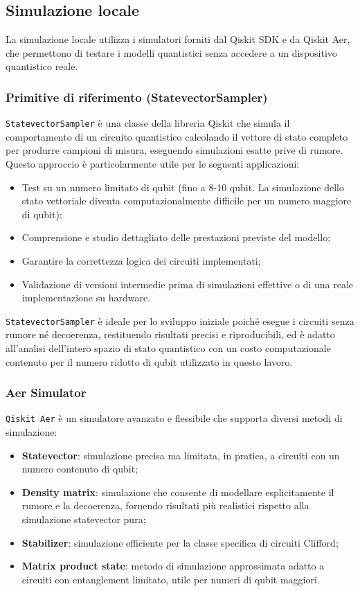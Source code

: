 \subsection{Simulazione locale}

La simulazione locale utilizza i simulatori forniti dal Qiskit SDK e da Qiskit Aer, che permettono di testare i modelli quantistici senza accedere a un dispositivo quantistico reale.

\subsubsection{Primitive di riferimento (StatevectorSampler)}
\texttt{StatevectorSampler} è una classe della libreria Qiskit che simula il comportamento di un circuito quantistico calcolando il vettore di stato completo per produrre campioni di misura, eseguendo simulazioni esatte prive di rumore.
Questo approccio è particolarmente utile per le seguenti applicazioni:
\begin{itemize}
    \item Test su un numero limitato di qubit (fino a 8-10 qubit. La simulazione dello stato vettoriale diventa computazionalmente difficile per un numero maggiore di qubit);
    \item Comprensione e studio dettagliato delle prestazioni previste del modello;
    \item Garantire la correttezza logica dei circuiti implementati;
    \item Validazione di versioni intermedie prima di simulazioni effettive o di una reale implementazione su hardware.
\end{itemize}

\texttt{StatevectorSampler} è ideale per lo sviluppo iniziale poiché esegue i circuiti senza rumore né decoerenza, restituendo risultati precisi e riproducibili, ed è adatto all'analisi dell'intero spazio di stato quantistico con un costo computazionale contenuto per il numero ridotto di qubit utilizzato in questo lavoro.

\subsubsection{Aer Simulator}
\texttt{Qiskit Aer} è un simulatore avanzato e flessibile che supporta diversi metodi di simulazione:
\begin{itemize}
    \item \textbf{Statevector}: simulazione precisa ma limitata, in pratica, a circuiti con un numero contenuto di qubit;
    \item \textbf{Density matrix}: simulazione che consente di modellare esplicitamente il rumore e la decoerenza, fornendo risultati più realistici rispetto alla simulazione statevector pura;
    \item \textbf{Stabilizer}: simulazione efficiente per la classe specifica di circuiti Clifford;
    \item \textbf{Matrix product state}: metodo di simulazione approssimata adatto a circuiti con entanglement limitato, utile per numeri di qubit maggiori.
\end{itemize}


